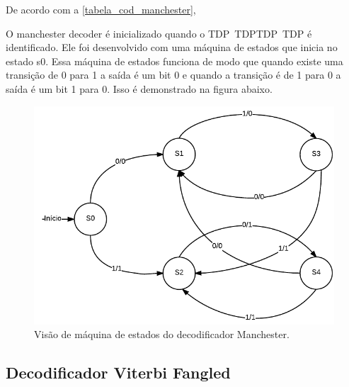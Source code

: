 	De acordo com a \autoref{tabela_cod_manchester}, 
	
		O manchester decoder é inicializado quando o TDP~TDPTDP~TDP é identificado. Ele foi desenvolvido com uma máquina de estados que inicia no estado s0. Essa máquina de estados funciona de modo que quando existe uma transição de 0 para 1 a saída é um bit 0 e quando a transição é de 1 para 0 a saída é um bit 1 para 0. Isso é demonstrado na figura abaixo. 
		
	\begin{figure}[h]
		\caption{\label{figure:manchester-decoder-flow}Visão de máquina de estados do decodificador Manchester.}
		\centering
		\includegraphics[width=0.6\textheight]{manchester/decoder-flow.pdf}
	\end{figure}
	
	
	\subsection{Decodificador Viterbi Fangled}
	
